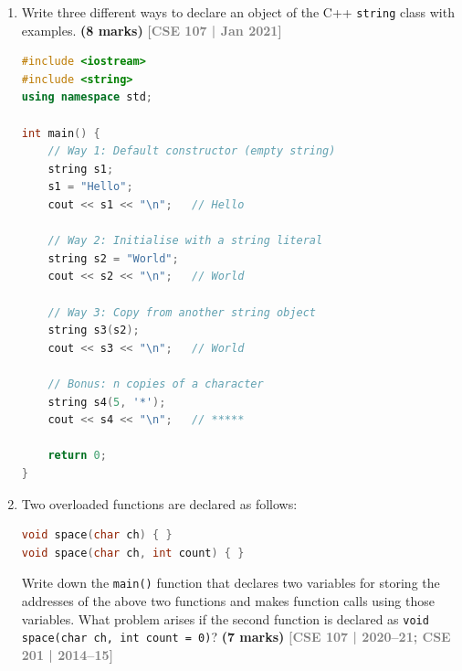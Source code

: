 \documentclass[12pt,a3paper]{article}
\newcommand{\yr}[1]{\hfill\textcolor{gray}{\small\textbf{[#1]}}}
\newcommand{\mk}[1]{\textcolor{orange!70!black}{\small\textbf{(#1 marks)}}}
\begin{document}
\begin{enumerate}
\begin{tcolorbox}
\end{tcolorbox}

\item Write three different ways to declare an object of the C++ \texttt{string} class with examples. \mk{8}
\yr{CSE 107 | Jan 2021}


\begin{tcolorbox}[enhanced,breakable,ansbox,colback=cC!4,colframe=cC,
  boxrule=0.8pt,arc=5pt,
  title={\textbf{Answer --- Three ways to declare a string object}},
  fonttitle=\bfseries\color{white},colbacktitle=cC]

\begin{lstlisting}[language=C++]
#include <iostream>
#include <string>
using namespace std;

int main() {
    // Way 1: Default constructor (empty string)
    string s1;
    s1 = "Hello";
    cout << s1 << "\n";   // Hello

    // Way 2: Initialise with a string literal
    string s2 = "World";
    cout << s2 << "\n";   // World

    // Way 3: Copy from another string object
    string s3(s2);
    cout << s3 << "\n";   // World

    // Bonus: n copies of a character
    string s4(5, '*');
    cout << s4 << "\n";   // *****

    return 0;
}
\end{lstlisting}

\end{tcolorbox}

\item Two overloaded functions are declared as follows:
\begin{lstlisting}[language=C++]
void space(char ch) { }
void space(char ch, int count) { }
\end{lstlisting}
Write down the \texttt{main()} function that declares two variables for storing the addresses of the above two functions and makes function calls using those variables. What problem arises if the second function is declared as \texttt{void space(char ch, int count = 0)}? \mk{7}
\yr{CSE 107 | 2020--21; CSE 201 | 2014--15}


\begin{tcolorbox}[enhanced,breakable,ansbox,colback=cC!4,colframe=cC,
  boxrule=0.8pt,arc=5pt,
  title={\textbf{Answer --- Function pointers for overloaded space(); default arg ambiguity}},
  fonttitle=\bfseries\color{white},colbacktitle=cC]


\end{tcolorbox}
\end{enumerate}
\end{document}

